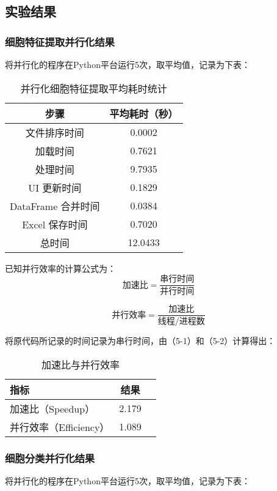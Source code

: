 \subsection{实验结果}
\subsubsection{细胞特征提取并行化结果}
将并行化的程序在Python平台运行5次，取平均值，记录为下表：
\begin{table}[!htbp]
    \centering
    \caption{并行化细胞特征提取平均耗时统计}
    \begin{tabular*}{350pt}{@{\extracolsep{\fill}}cc}
        \toprule
        步骤               & 平均耗时（秒） \\
        \midrule
        文件排序时间       & 0.0002 \\
        加载时间           & 0.7621 \\
        处理时间           & 9.7935 \\
        UI 更新时间         & 0.1829 \\
        DataFrame 合并时间 & 0.0384 \\
        Excel 保存时间     & 0.7020 \\
        总时间             & 12.0433 \\
        \bottomrule
    \end{tabular*}
\end{table}

已知并行效率的计算公式\cite{ref12}\cite{ref13}为：
\[
\text{加速比} = \frac{\text{串行时间}}{\text{并行时间}} \tag{5-1} 
\]

\[
\text{并行效率} = \frac{\text{加速比}}{\text{线程/进程数}} \tag{5-2} 
\]

将原代码所记录的时间记录为串行时间，由（5-1）和（5-2）计算得出：
\begin{table}[htbp]
    \centering
    \caption{加速比与并行效率}
    \begin{tabular}{lcc}
    \toprule
    指标 &   结果 \\
    \midrule
    加速比（Speedup）  & 2.179 \\
    并行效率（Efficiency）  & 1.089 \\
    \bottomrule
    \end{tabular}
    \end{table}
\newpage
\subsubsection{细胞分类并行化结果}
将并行化的程序在Python平台运行5次，取平均值，记录为下表：

